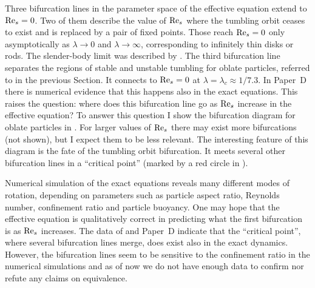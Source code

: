 \documentclass[thesis.tex]{subfiles}
\begin{document}
Three bifurcation lines in the parameter space of the effective equation extend to $\textrm{Re}_s=0$. Two of them describe the value of $\textrm{Re}_s$ where the tumbling orbit ceases to exist and is replaced by a pair of fixed points. Those reach $\textrm{Re}_s=0$ only asymptotically as $\lambda\to0$ and $\lambda\to\infty$, corresponding to infinitely thin disks or rods. The slender-body limit was described by \citet{subramanian2005}. The third bifurcation line separates the regions of stable and unstable tumbling for oblate particles, referred to in the previous Section. It connects to $\textrm{Re}_s=0$ at $\lambda=\lambda_c\approx1/7.3$. In Paper~D there is numerical evidence that this happens also in the exact equations. This raises the question: where does this bifurcation line go as $\textrm{Re}_s$ increase in the effective equation?
To answer this question I show the bifurcation diagram for oblate particles in . For larger values of $\textrm{Re}_s$ there may exist more bifurcations (not shown), but I expect them to be less relevant. The interesting feature of this diagram is the fate of the tumbling orbit bifurcation. It meets several other bifurcation lines in a ``critical point'' (marked by a red circle in ). 

Numerical simulation of the exact equations reveals many different modes of rotation, depending on parameters such as particle aspect ratio, Reynolds number, confinement ratio and particle buoyancy. One may hope that the effective equation is qualitatively correct in predicting what the first bifurcation is as $\textrm{Re}_s$ increases. The data of \citet{rosen2015b} and Paper~D indicate that the ``critical point'', where several bifurcation lines merge, does exist also in the exact dynamics. However, the bifurcation lines seem to be sensitive to the confinement ratio in the numerical simulations and as of now we do not have enough data to confirm nor refute any claims on equivalence.
\end{document}
